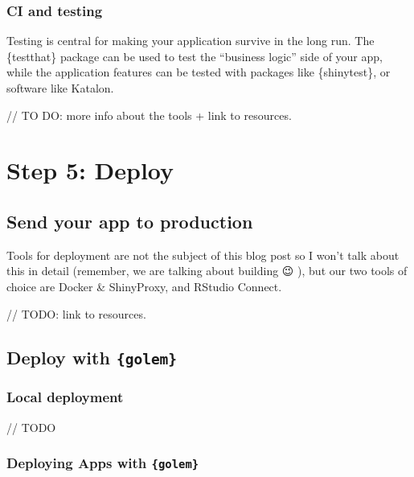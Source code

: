 \documentclass[]{book}
\begin{document}
\hypertarget{ci-and-testing}{%
\section{CI and testing}\label{ci-and-testing}}

Testing is central for making your application survive in the long run. The \{testthat\} package can be used to test the ``business logic'' side of your app, while the application features can be tested with packages like \{shinytest\}, or software like Katalon.

// TO DO: more info about the tools + link to resources.

\hypertarget{part-step-5-deploy}{%
\part{Step 5: Deploy}\label{part-step-5-deploy}}

\hypertarget{stepdeploy}{%
\chapter{Send your app to production}\label{stepdeploy}}

Tools for deployment are not the subject of this blog post so I won't talk about this in detail (remember, we are talking about building 😉 ), but our two tools of choice are Docker \& ShinyProxy, and RStudio Connect.

// TODO: link to resources.

\hypertarget{deploy-golem}{%
\chapter{\texorpdfstring{Deploy with \texttt{\{golem\}}}{Deploy with \{golem\}}}\label{deploy-golem}}

\hypertarget{local-deployment-1}{%
\section{Local deployment}\label{local-deployment-1}}

// TODO

\hypertarget{deploying-apps-with-golem}{%
\section{\texorpdfstring{Deploying Apps with \texttt{\{golem\}}}{Deploying Apps with \{golem\}}}\label{deploying-apps-with-golem}}
\end{document}
